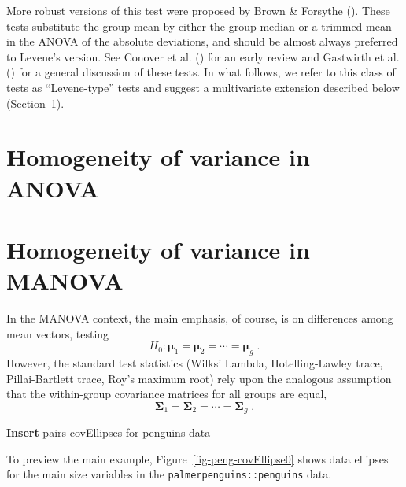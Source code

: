 \documentclass[
  letterpaper,
  10pt,
  krantz2]{krantz}
\begin{document}
{More robust versions of this test were proposed by Brown \& Forsythe
(). These tests substitute the
group mean by either the group median or a trimmed mean in the ANOVA of
the absolute deviations, and should be almost always preferred to
Levene's version. See Conover et al.
() for an early review and
Gastwirth et al. () for a
general discussion of these tests. In what follows, we refer to this
class of tests as ``Levene-type'' tests and suggest a multivariate
extension described below (Section~\ref{sec-mlevene}).

\section{Homogeneity of variance in ANOVA}\label{sec-mlevene}

\section{Homogeneity of variance in
MANOVA}\label{sec-homogeneity-MANOVA}

In the MANOVA context, the main emphasis, of course, is on differences
among mean vectors, testing \[
H_0 : \mathbf{\mu}_1 = \mathbf{\mu}_2 = \cdots = \mathbf{\mu}_g \; .
\] However, the standard test statistics (Wilks' Lambda,
Hotelling-Lawley trace, Pillai-Bartlett trace, Roy's maximum root) rely
upon the analogous assumption that the within-group covariance matrices
for all groups are equal, \[
\mathbf{\Sigma}_1 = \mathbf{\Sigma}_2 = \cdots = \mathbf{\Sigma}_g \; .
\]

\textbf{Insert} pairs covEllipses for penguins data

To preview the main example, Figure~\ref{fig-peng-covEllipse0} shows
data ellipses for the main size variables in the
\texttt{palmerpenguins::penguins} data.

\begin{figure}

\end{figure}}
\end{document}
